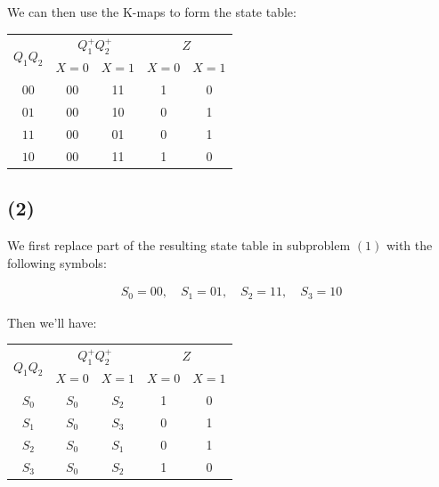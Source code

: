 \documentclass{article}
\begin{document}
We can then use the K-maps to form the state table:

\begin{table}[H]
    \centering
    \begin{tabular}{|c||c|c||c|c|}
        \hline
        \multirow{2}{*}{$Q_1Q_2$} & \multicolumn{2}{c||}{$Q_1^+Q_2^+$} & \multicolumn{2}{c|}{$Z$} \\
        \cline{2-5}
        & $X = 0$ & $X = 1$ & $X = 0$ & $X = 1$ \\
        \hline
        $00$ & 00 & 11 & 1 & 0 \\
        \hline
        $01$ & 00 & 10 & 0 & 1 \\
        \hline
        $11$ & 00 & 01 & 0 & 1 \\
        \hline
        $10$ & 00 & 11 & 1 & 0 \\
        \hline
    \end{tabular}
\end{table}

\subsection*{(2)}

We first replace part of the resulting state table in subproblem $(1)$ with the following symbols:

\begin{align*}
    S_0 = 00, \quad S_1 = 01, \quad S_2 = 11, \quad S_3 = 10
\end{align*}

Then we'll have:

\begin{table}[H]
    \centering
    \begin{tabular}{|c||c|c||c|c|}
        \hline
        \multirow{2}{*}{$Q_1Q_2$} & \multicolumn{2}{c||}{$Q_1^+Q_2^+$} & \multicolumn{2}{c|}{$Z$} \\
        \cline{2-5}
        & $X = 0$ & $X = 1$ & $X = 0$ & $X = 1$ \\
        \hline
        $S_0$ & $S_0$ & $S_2$ & 1 & 0 \\
        \hline
        $S_1$ & $S_0$ & $S_3$ & 0 & 1 \\
        \hline
        $S_2$ & $S_0$ & $S_1$ & 0 & 1 \\
        \hline
        $S_3$ & $S_0$ & $S_2$ & 1 & 0 \\
        \hline
    \end{tabular}
\end{table}
\end{document}
